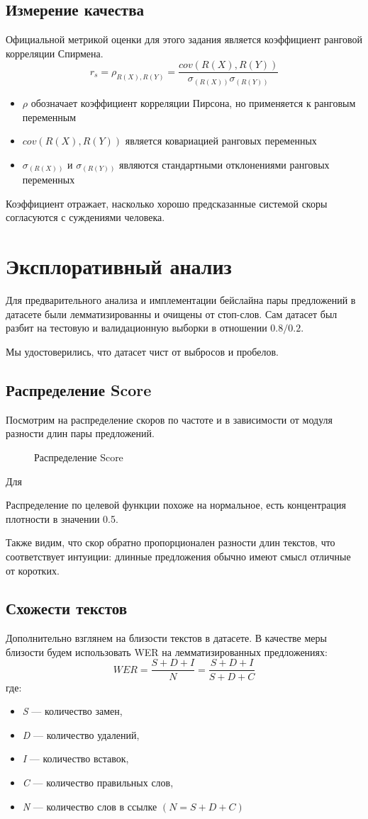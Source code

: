 \documentclass[12pt]{article}
\newcommand{\imgh}[3]
{
\begin{figure}[H]
\center{\texttt{[image: \#2]}}
\caption{#3}
\label{ris:#2}
\end{figure}
}
\begin{document}
\subsection{Измерение качества}
Официальной метрикой оценки для этого задания является коэффициент ранговой корреляции Спирмена.
$$
r_s = \rho_{R(X), R(Y)} = \frac{cov(R(X), R(Y))}{\sigma_{(R(X))} \sigma_{(R(Y))}}
$$
\begin{itemize}
    \item $\rho$ обозначает коэффициент корреляции Пирсона, но применяется к ранговым переменным
    \item $cov(R(X), R(Y))$ является ковариацией ранговых переменных
    \item $\sigma_{(R(X))}$ и $\sigma_{(R(Y))}$ являются стандартными отклонениями ранговых переменных
\end{itemize}
Коэффициент отражает, насколько хорошо предсказанные системой скоры согласуются с суждениями человека.

\newpage

\section{Эксплоративный анализ}
Для предварительного анализа и имплементации бейслайна пары предложений в датасете были лемматизированны и очищены от стоп-слов. Сам датасет был разбит на тестовую и валидационную выборки в отношении $0.8 / 0.2$.

Мы удостоверились, что датасет чист от выбросов и пробелов.

\subsection{Распределение Score}
Посмотрим на распределение скоров по частоте и в зависимости от модуля разности длин пары предложений.
\imgh{17cm}{score_distribution.png}{Распределение Score}
Для


Распределение по целевой функции похоже на нормальное, есть концентрация плотности в значении 0.5. 

Также видим, что скор обратно пропорционален разности длин текстов, что соответствует интуиции: длинные предложения обычно имеют смысл отличные от коротких.
\newpage

\subsection{Схожести текстов}
Дополнительно взглянем на близости текстов в датасете. В качестве меры близости будем использовать WER на лемматизированных предложениях:
$$ WER = \frac{S + D + I}{N} =  \frac{S + D + I}{S + D + C}$$
где:
\begin{itemize}
    \item \textit{S} — количество замен,
    \item \textit{D} — количество удалений,
    \item \textit{I} — количество вставок,
    \item \textit{C} — количество правильных слов,
    \item \textit{N} — количество слов в ссылке $(N = S + D + C)$
\end{itemize}
\end{document}
